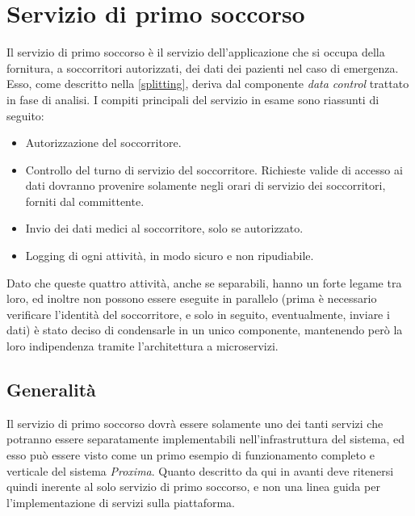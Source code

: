 \documentclass[a4paper,12pt]{report}
\begin{document}
\section{Servizio di primo soccorso}
Il servizio di primo soccorso è il servizio dell'applicazione che si occupa della fornitura, a soccorritori autorizzati, dei dati dei pazienti nel caso di emergenza. Esso, come descritto nella \autoref{splitting}, deriva dal componente \emph{data control} trattato in fase di analisi. I compiti principali del servizio in esame sono riassunti di seguito: 
\begin{itemize}
	\item Autorizzazione del soccorritore.
	\item Controllo del turno di servizio del soccorritore. Richieste valide di accesso ai dati dovranno provenire solamente negli orari di servizio dei soccorritori, forniti dal committente. 
	\item Invio dei dati medici al soccorritore, solo se autorizzato.
	\item Logging di ogni attività, in modo sicuro e non ripudiabile.
\end{itemize}
Dato che queste quattro attività, anche se separabili, hanno un forte legame tra loro, ed inoltre non possono essere eseguite in parallelo (prima è necessario verificare l'identità del soccorritore, e solo in seguito, eventualmente, inviare i dati) è stato deciso di condensarle in un unico componente, mantenendo però la loro indipendenza tramite l'architettura a microservizi. 

\subsection{Generalità}
Il servizio di primo soccorso dovrà essere solamente uno dei tanti servizi che potranno essere separatamente implementabili nell'infrastruttura del sistema, ed esso può essere visto come un primo esempio di funzionamento completo e verticale del sistema \emph{Proxima}. Quanto descritto da qui in avanti deve ritenersi quindi inerente al solo servizio di primo soccorso, e non una linea guida per l'implementazione di servizi sulla piattaforma.
\end{document}

